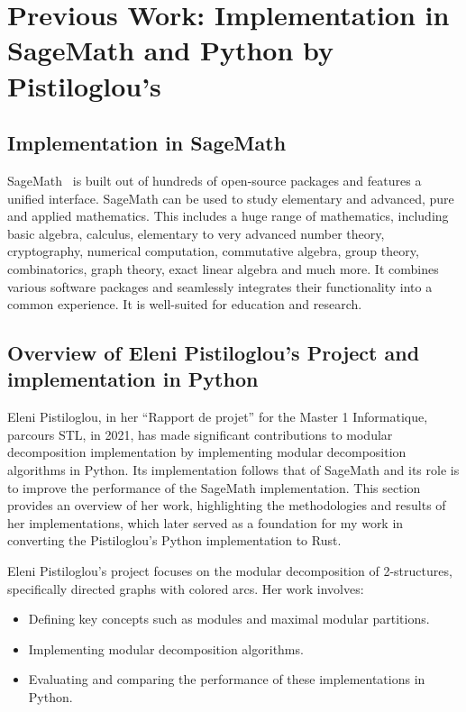 
\chapter{Previous Work: Implementation in SageMath and Python by Pistiloglou’s}\label{ch:previous-work-implementation-in-sagemath-and-python}

\section{Implementation in SageMath}\label{sec:implementation-in-sagemath}

SageMath~\cite{sagemathtour} is built out of hundreds of open-source packages and features a unified interface.
SageMath can be used to study elementary and advanced, pure and applied mathematics.
This includes a huge range of mathematics, including basic algebra, calculus, elementary to very advanced number theory, cryptography, numerical computation, commutative algebra, group theory, combinatorics, graph theory, exact linear algebra and much more.
It combines various software packages and seamlessly integrates their functionality into a common experience.
It is well-suited for education and research.


\section{Overview of Eleni Pistiloglou's Project and implementation in Python}\label{sec:overview-of-eleni-pistiloglou's-project-and-implementation-in-python}

Eleni Pistiloglou, in her ``Rapport de projet''\cite{DM2S} for the Master 1 Informatique, parcours STL, in 2021, has made significant contributions to modular decomposition implementation by implementing modular decomposition algorithms in Python.
Its implementation follows that of SageMath and its role is to improve the performance of the SageMath implementation.
This section provides an overview of her work, highlighting the methodologies and results of her implementations, which later served as a foundation for my work in converting the Pistiloglou’s Python implementation to Rust.

Eleni Pistiloglou's project focuses on the modular decomposition of 2-structures, specifically directed graphs with colored arcs.
Her work involves:
\begin{itemize}
    \item Defining key concepts such as modules and maximal modular partitions.
    \item Implementing modular decomposition algorithms.
    \item Evaluating and comparing the performance of these implementations in Python.
\end{itemize}

